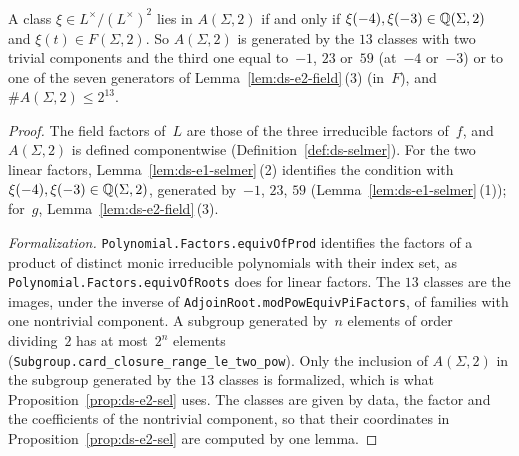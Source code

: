 \begin{lemma}[$A(\Sigma, 2)$ of~E2]
\label{lem:ds-e2-selmer}
\leanok
{}
A class $\xi \in L^\times/(L^\times)^2$ lies in $A(\Sigma, 2)$ if and only if
$\xi(-4), \xi(-3) \in \mathbb{Q}(\Sigma, 2)$ and $\xi(t) \in F(\Sigma, 2)$. So $A(\Sigma, 2)$ is
generated by the $13$ classes with two trivial components and the third one equal to~$-1$, $23$
or~$59$ (at~$-4$ or~$-3$) or to one of the seven generators of Lemma~\ref{lem:ds-e2-field}\,(3)
(in~$F$), and $\#A(\Sigma, 2) \le 2^{13}$.
\end{lemma}

\begin{proof}
\leanok
{}
The field factors of~$L$ are those of the three irreducible factors of~$f$, and $A(\Sigma, 2)$ is
defined componentwise (Definition~\ref{def:ds-selmer}). For the two linear factors,
Lemma~\ref{lem:ds-e1-selmer}\,(2) identifies the condition with
$\xi(-4), \xi(-3) \in \mathbb{Q}(\Sigma, 2)$, generated by~$-1$, $23$, $59$
(Lemma~\ref{lem:ds-e1-selmer}\,(1)); for~$g$, Lemma~\ref{lem:ds-e2-field}\,(3).

\emph{Formalization.} \texttt{Polynomial.Factors.equivOfProd} identifies the factors of a product
of distinct monic irreducible polynomials with their index set, as
\texttt{Polynomial.Factors.equivOfRoots} does for linear factors. The $13$ classes are the images,
under the inverse of \texttt{AdjoinRoot.modPowEquivPiFactors}, of families with one nontrivial
component. A subgroup generated by~$n$ elements of order dividing~$2$ has at most~$2^n$ elements
(\texttt{Subgroup.card\_closure\_range\_le\_two\_pow}). Only the inclusion of $A(\Sigma, 2)$ in the
subgroup generated by the $13$ classes is formalized, which is what
Proposition~\ref{prop:ds-e2-sel} uses. The classes are given by data, the factor and the
coefficients of the nontrivial component, so that their coordinates in
Proposition~\ref{prop:ds-e2-sel} are computed by one lemma.
\end{proof}

